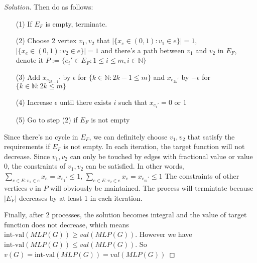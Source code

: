\begin{proof}[Solution]
        Then do as follows:
        \begin{itemize}
            \item[(1)] If $E_F$ is empty, terminate.
            \item[(2)] Choose 2 vertex $v_1,v_2$ that $|\{x_e\in(0,1):v_1\in e\}|=1$, $|\{x_e\in(0,1):v_2\in e\}|=1$ and there's a path between $v_1$ and $v_2$ in $E_F$, denote it $P:=\{e_{i}'\in E_F:1\le i \le m,i\in\mathbb{N}\}$
            \item[(3)] Add $x_{e_{2k-1}'}$ by $\epsilon$ for $\{k\in\mathbb{N}:2k-1\le m\}$ and $x_{e_{2k}'}$ by $-\epsilon$ for $\{k\in\mathbb{N}:2k\le m\}$
            \item[(4)] Increase $\epsilon$ until there exists $i$ such that $x_{e_{i}'}=0 \text{ or } 1$
            \item[(5)] Go to step (2) if $E_F$ is not empty
        \end{itemize}
        Since there's no cycle in $E_F$, we can definitely choose $v_1,v_2$ that satisfy the requirements if $E_F$ is not empty.
        In each iteration, the target function will not decrease.
        Since $v_1,v_2$ can only be touched by edges with fractional value or value 0, the constraints of $v_1,v_2$ can be satisfied.
        In other words, $\sum_{e\in E:v_1\in e}x_e =x_{e_{1}'} \le 1$, $\sum_{e\in E:v_2\in e}x_e =x_{e_{m}'} \le 1$
        The constraints of other vertices $v$ in $P$ will obviously be maintained.
        The process will termintate because $|E_F|$ decreases by at least 1 in each iteration.

        Finally, after 2 processes, the solution becomes integral and the value of target function does not decrease, which means $\text{int-val}(MLP(G))\ge val(MLP(G))$.
        However we have  $\text{int-val}(MLP(G))\le val(MLP(G))$.
        So $v(G)=\text{int-val}(MLP(G))= val(MLP(G))$
    \end{proof}

